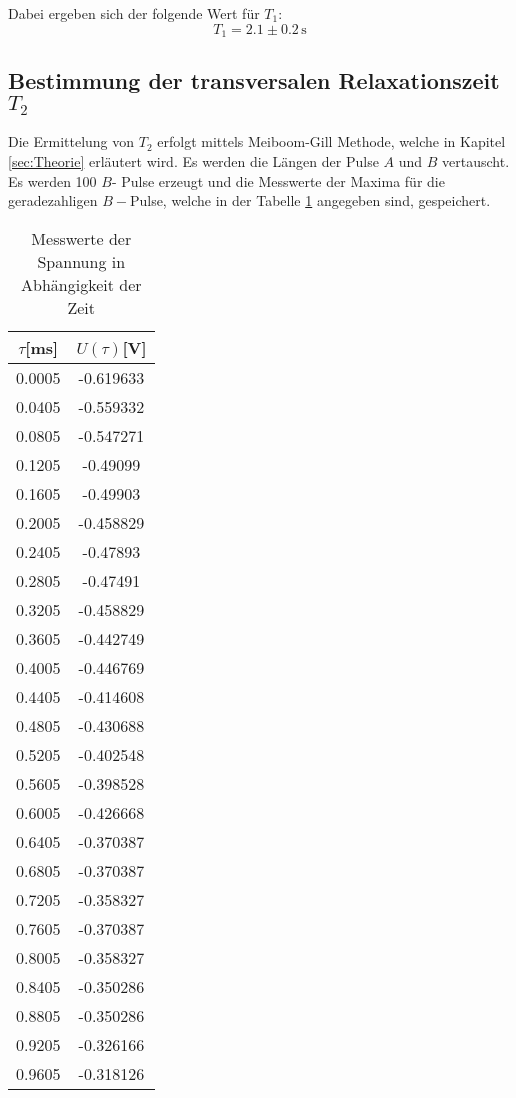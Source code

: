 Dabei ergeben sich der folgende Wert für $T_1$:
$$T_1=2.1 \pm 0.2 \, \text{s}$$

\subsection{Bestimmung der transversalen Relaxationszeit $T_2$}
Die Ermittelung von $T_2$ erfolgt mittels Meiboom-Gill Methode,
welche in Kapitel \ref{sec:Theorie} erläutert wird. Es werden
die Längen der Pulse $A$ und $B$ vertauscht. Es werden
100 $B$- Pulse erzeugt und die Messwerte der Maxima für die geradezahligen
$B-$Pulse, welche in der Tabelle \ref{bpulse} angegeben sind, gespeichert.


\begin{table}
  \centering
  \caption{Messwerte der Spannung in Abhängigkeit der Zeit}
  \label{bpulse}
  \begin{tabular}{c|c}
    \toprule
    $\tau$[ms] & $U(\tau)$[V]\\
    \midrule
    0.0005 &-0.619633 \\
    0.0405&-0.559332\\
    0.0805 &-0.547271\\
    0.1205&-0.49099\\
    0.1605&-0.49903\\
    0.2005&-0.458829\\
    0.2405&-0.47893\\
    0.2805&-0.47491\\
    0.3205&-0.458829\\
    0.3605&-0.442749\\
    0.4005&-0.446769\\
    0.4405&-0.414608\\
    0.4805&-0.430688\\
    0.5205&-0.402548\\
    0.5605&-0.398528\\
    0.6005&-0.426668\\
    0.6405&-0.370387\\
    0.6805&-0.370387\\
    0.7205&-0.358327\\
    0.7605&-0.370387\\
    0.8005&-0.358327\\
    0.8405&-0.350286\\
    0.8805&-0.350286\\
    0.9205&-0.326166\\
    0.9605&-0.318126\\

\end{tabular}
\end{table}
